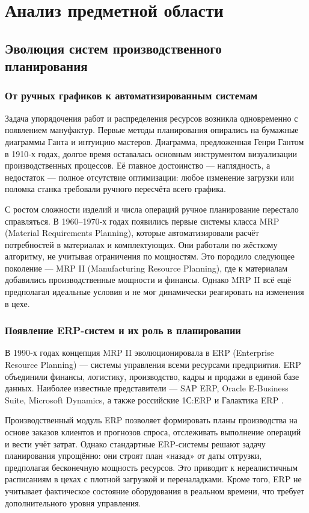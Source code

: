 \section{Анализ предметной области}
\subsection{Эволюция систем производственного планирования}
\subsubsection{От ручных графиков к автоматизированным системам}

Задача упорядочения работ и распределения ресурсов возникла одновременно с появлением мануфактур. Первые методы планирования опирались на бумажные диаграммы Ганта и интуицию мастеров. Диаграмма, предложенная Генри Гантом в 1910‑х годах, долгое время оставалась основным инструментом визуализации производственных процессов. Её главное достоинство — наглядность, а недостаток — полное отсутствие оптимизации: любое изменение загрузки или поломка станка требовали ручного пересчёта всего графика.

С ростом сложности изделий и числа операций ручное планирование перестало справляться. В 1960–1970‑х годах появились первые системы класса MRP (Material Requirements Planning), которые автоматизировали расчёт потребностей в материалах и комплектующих. Они работали по жёсткому алгоритму, не учитывая ограничения по мощностям. Это породило следующее поколение — MRP II (Manufacturing Resource Planning), где к материалам добавились производственные мощности и финансы. Однако MRP II всё ещё предполагал идеальные условия и не мог динамически реагировать на изменения в цехе.

\subsubsection{Появление ERP-систем и их роль в планировании}

В 1990‑х годах концепция MRP II эволюционировала в ERP (Enterprise Resource Planning) — системы управления всеми ресурсами предприятия. ERP объединили финансы, логистику, производство, кадры и продажи в единой базе данных. Наиболее известные представители — SAP ERP, Oracle E-Business Suite, Microsoft Dynamics, а также российские 1С:ERP и Галактика ERP \cite{borovkov}.

Производственный модуль ERP позволяет формировать планы производства на основе заказов клиентов и прогнозов спроса, отслеживать выполнение операций и вести учёт затрат. Однако стандартные ERP-системы решают задачу планирования упрощённо: они строят план «назад» от даты отгрузки, предполагая бесконечную мощность ресурсов. Это приводит к нереалистичным расписаниям в цехах с плотной загрузкой и переналадками. Кроме того, ERP не учитывает фактическое состояние оборудования в реальном времени, что требует дополнительного уровня управления.

